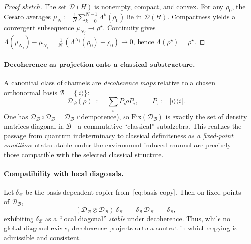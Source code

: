 \documentclass[11pt]{article}
\theoremstyle{upright}
\begin{document}
\begin{proof}[Proof sketch]
The set $\mathcal{D}(H)$ is nonempty, compact, and convex. For any $\rho_0$, the Ces\`aro averages $\mu_N:=\frac{1}{N}\sum_{k=0}^{N-1}\Lambda^k(\rho_0)$ lie in $\mathcal{D}(H)$. Compactness yields a convergent subsequence $\mu_{N_j}\to \rho^\star$. Continuity gives $\Lambda(\mu_{N_j})-\mu_{N_j}=\frac{1}{N_j}(\Lambda^{N_j}(\rho_0)-\rho_0)\to 0$, hence $\Lambda(\rho^\star)=\rho^\star$.
\end{proof}

\paragraph{Decoherence as projection onto a classical substructure.}
A canonical class of channels are \emph{decoherence maps} relative to a chosen orthonormal basis $\mathcal{B}=\{|i\rangle\}$:
\begin{equation}
\mathcal{D}_{\mathcal{B}}(\rho) \;:=\; \sum_i P_i \rho P_i,
\qquad P_i:=|i\rangle\!\langle i|.
\label{eq:decoherence}
\end{equation}
One has $\mathcal{D}_{\mathcal{B}}\circ \mathcal{D}_{\mathcal{B}}=\mathcal{D}_{\mathcal{B}}$ (idempotence), so $\mathrm{Fix}(\mathcal{D}_{\mathcal{B}})$ is exactly the set of density matrices diagonal in $\mathcal{B}$---a commutative ``classical'' subalgebra. This realizes the passage from quantum indeterminacy to classical definiteness \emph{as a fixed-point condition}: states stable under the environment-induced channel are precisely those compatible with the selected classical structure.

\paragraph{Compatibility with local diagonals.}
Let $\delta_{\mathcal{B}}$ be the basis-dependent copier from~\eqref{eq:basis-copy}. Then on fixed points of $\mathcal{D}_{\mathcal{B}}$,
\[
(\mathcal{D}_{\mathcal{B}}\otimes \mathcal{D}_{\mathcal{B}})\,\delta_{\mathcal{B}} \;=\; \delta_{\mathcal{B}}\,\mathcal{D}_{\mathcal{B}} \;=\; \delta_{\mathcal{B}},
\]
exhibiting $\delta_{\mathcal{B}}$ as a ``local diagonal'' \emph{stable} under decoherence. Thus, while no global diagonal exists, decoherence projects onto a context in which copying is admissible and consistent.
\end{document}

